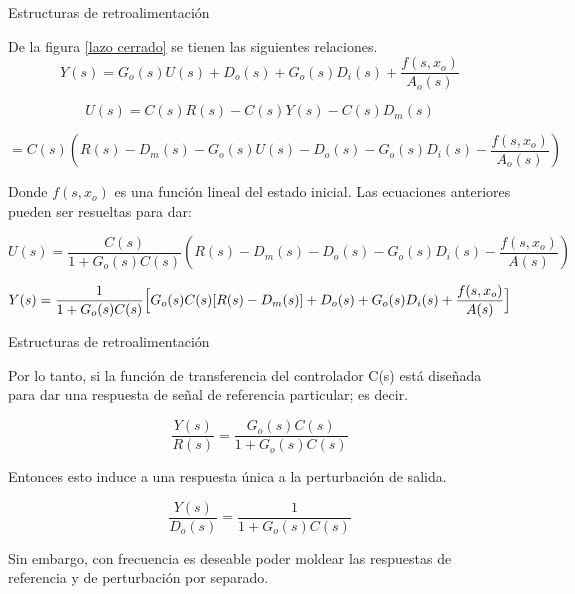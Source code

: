 \documentclass{beamer}
\begin{document}
\begin{frame}{Estructuras de retroalimentación}
\begin{justify}
{\footnotesize
De la figura \ref{lazo cerrado} se tienen las siguientes relaciones.
\begin{equation}
Y(s)=G_o(s)U(s)+D_o(s)+G_o(s)D_i(s)+\frac{f(s,x_o)}{A_o(s)}
\end{equation}

\begin{equation}
U(s)=C(s)R(s)-C(s)Y(s)-C(s)D_m(s)
\end{equation}

\[=C(s)\left ( R(s)-D_m(s)-G_o(s)U(s)-D_o(s)-G_o(s)D_i(s)-\frac{f(s,x_o)}{A_o(s)}\right )\]

Donde $f(s,x_o)$ es una función lineal del estado inicial. Las ecuaciones anteriores pueden ser resueltas para dar:

\[U(s)=\frac{C(s)}{1+G_o(s)C(s)} \left ( R(s)-D_m(s)-D_o(s)-G_o(s)D_i(s)-\frac{f(s,x_o)}{A(s)} \right ) \]

\begin{equation*}
    Y(s)= \frac{1}{1+G_o(s)C(s)} \Bigl[ G_o(s)C(s)[R(s)-D_m(s)]  +D_o(s)+G_o(s)D_i(s)+ \frac{f(s,x_o)}{A(s)} \Bigr]
\end{equation*}

}

\end{justify}
\end{frame}


\begin{frame}{Estructuras de retroalimentación}
\begin{justify}
\small

Por lo tanto, si la función de transferencia del controlador C(s) está diseñada para dar una respuesta de señal de referencia particular; es decir.

\vspace{0.3cm}
\[\frac{Y(s)}{R(s)}=\frac{G_o(s)C(s)}{1+G_o(s)C(s)}\]

\vspace{0.3cm}
Entonces esto induce a una respuesta única a la perturbación de salida.

\vspace{0.3cm}
\[\frac{Y(s)}{D_o(s)}=\frac{1}{1+G_o(s)C(s)}\]

\vspace{0.3cm}
Sin embargo, con frecuencia es deseable poder moldear las respuestas de referencia y de perturbación por separado. 

\end{justify}
\end{frame}
\end{document}
